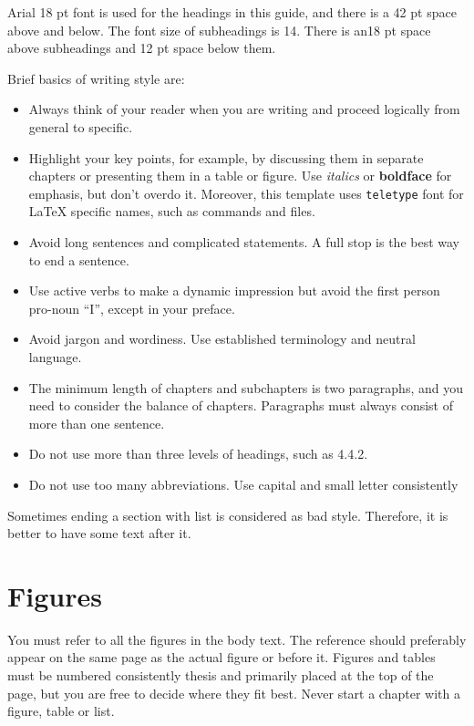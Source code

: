 \documentclass[12pt,a4paper,english
]{tunithesis}
\begin{document}
Arial 18 pt font is used for the headings in this guide, and there is
a 42 pt space above and below. The font size of subheadings is
14. There is an18 pt space above subheadings and 12 pt space below
them.

Brief basics of writing style are:
\begin{itemize}
\item Always think of your reader when you are writing and proceed
  logically from general to specific.
\item Highlight your key points, for example, by discussing them in
  separate chapters or presenting them in a table or figure. Use
  \textit{italics} or \textbf{boldface} for emphasis, but don't overdo
  it.  Moreover, this template uses \texttt{teletype} font for LaTeX
  specific names, such as commands and files.
\item Avoid long sentences and complicated statements. A full stop is
  the best way to end a sentence.
\item Use active verbs to make a dynamic impression but avoid the
  first person pro-noun ``I'', except in your preface.
\item Avoid jargon and wordiness. Use established terminology and
  neutral language.
\item The minimum length of chapters and subchapters is two
  paragraphs, and you need to consider the balance of
  chapters. Paragraphs must always consist of more than one sentence.
\item Do not use more than three levels of headings, such as 4.4.2.
\item Do not use too many abbreviations. Use capital and small letter
  consistently
\end{itemize}

Sometimes ending a section with list is considered as bad
style. Therefore, it is better to have some text after it.


\section{Figures}
You must refer to all the figures in the body text. The reference
should preferably appear on the same page as the actual figure or
before it. Figures and tables must be numbered consistently thesis
and primarily placed at the top of the page, but you are free to
decide where they fit best. Never start a chapter with a figure, table
or list.
\end{document}
